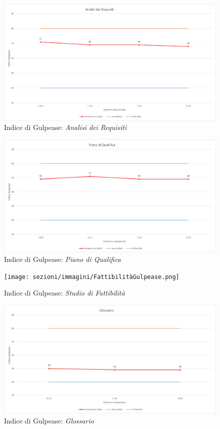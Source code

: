 \pagebreak
\begin{figure}[!ht]
    \caption{Indice di Gulpease: \textit{Analisi dei Requisiti}}
    \vspace{10px}
    \includegraphics[scale=0.5]{sezioni/immagini/AnalisiGulpease.png}
    \centering
\end{figure}
\begin{figure}[!ht]
    \caption{Indice di Gulpease: \textit{Piano di Qualifica}}
    \vspace{10px}
    \includegraphics[scale=0.5]{sezioni/immagini/PianoQualificaGulpease.png}
    \centering
\end{figure}
\pagebreak
\begin{figure}[!ht]
    \caption{Indice di Gulpease: \textit{Studio di Fattibilità}}
    \vspace{10px}
    \texttt{[image: sezioni/immagini/FattibilitàGulpease.png]}
    \centering
\end{figure}
\begin{figure}[!ht]
    \caption{Indice di Gulpease: \textit{Glossario}}
    \vspace{10px}
    \includegraphics[scale=0.5]{sezioni/immagini/GlossarioGulpease.png}
    \centering
\end{figure}
\pagebreak
